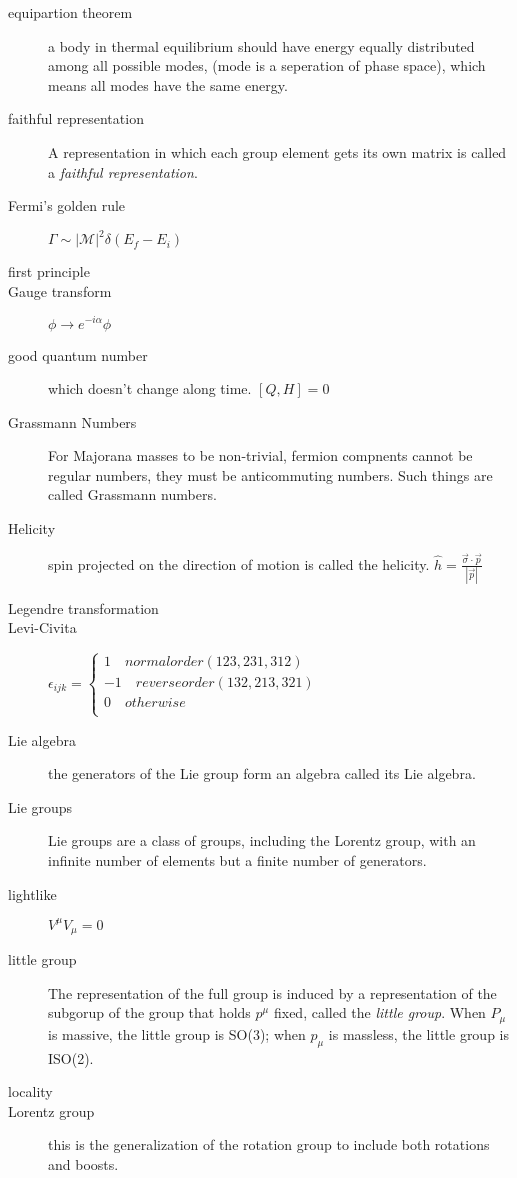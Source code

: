 \begin{description}
    \item [equipartion theorem] a body in thermal equilibrium should have
	energy equally distributed among all possible modes, (mode is a
	seperation of phase space), which means all modes have the same
	energy.

    \item [faithful representation] A representation in which each group
	element gets its own matrix is called a \emph{faithful
	representation}.
    \item [Fermi's golden rule]	$\Gamma \sim |\mathcal{M}|^{2}\delta(E_f - E_i)$
    \item [first principle]

    \item [Gauge transform] $\phi \rightarrow e^{-i\alpha}\phi$
    \item [good quantum number] which doesn't change along time. $[Q, H] = 0$
    \item [Grassmann Numbers] For Majorana masses to be non-trivial, fermion 
	compnents cannot be regular numbers, they must be anticommuting numbers. 
	Such things are called Grassmann numbers.

    \item [Helicity] spin projected on the direction of motion is called the
	helicity. $\hat{h}=\frac{\vec{\sigma}\cdot\vec{p}}{|\vec{p}|}$

    \item [Legendre transformation]
    \item [Levi-Civita] $\epsilon_{ijk} = \left\{
	\begin{aligned}
	    1\quad  normal order(123,231,312) \\
	    -1\quad reverse order(132,213,321)	\\
	    0\quad  otherwise	\\
	\end{aligned} \right.$
    \item [Lie algebra] the generators of the Lie group form an algebra
	called its Lie algebra. 
    \item [Lie groups]	Lie groups are a class of groups, including the
	Lorentz group, with an infinite number of elements but a finite
	number of generators.
    \item [lightlike]	$V^\mu V_\mu = 0$
    \item [little group] The representation of the full \Poincare{}
	group is induced by a representation of the subgorup of the
	\Poincare{} group that holds $p^\mu$ fixed, called the
	\emph{little group}. When $P_\mu$ is massive, the little group is
	SO(3); when $p_\mu$ is massless, the little group is ISO(2).
    \item [locality]
    \item [Lorentz group] this is the generalization of the rotation group
	to include both rotations and boosts.


\end{description}
